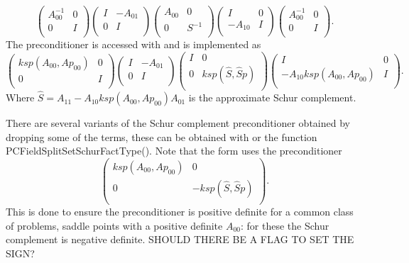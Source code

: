 \[
\left( \begin{array}{cc}
A_{00}^{-1}   & 0 \\
0 & I \\
\end{array} \right)
\left( \begin{array}{cc}
I   & -A_{01} \\
0 & I \\
\end{array} \right)
\left( \begin{array}{cc}
A_{00}  & 0 \\
0 & S^{-1} \\
\end{array} \right)
\left( \begin{array}{cc}
I   & 0 \\
-A_{10} & I \\
\end{array} \right)
\left( \begin{array}{cc}
A_{00}^{-1}   & 0 \\
0 & I \\
\end{array} \right).
\]
The preconditioner is accessed with  and is implemented as
\[
\left( \begin{array}{cc}
ksp(A_{00},Ap_{00})   & 0 \\
0 & I \\
\end{array} \right)
\left( \begin{array}{cc}
I   & -A_{01} \\
0 & I \\
\end{array} \right)
\left( \begin{array}{cc}
I  & 0 \\
0 & ksp(\hat{S},\hat{S}p) \\
\end{array} \right)
\left( \begin{array}{cc}
I   & 0 \\
-A_{10} ksp(A_{00},Ap_{00}) & I \\
\end{array} \right).
\]
Where $\hat{S} = A_{11} - A_{10} ksp(A_{00},Ap_{00}) A_{01}$ is the approximate Schur complement.

There are several variants of the Schur complement preconditioner obtained by dropping some of the terms, these can be obtained with  or the function PCFieldSplitSetSchurFactType(). Note that the  form uses the preconditioner
\[
\left( \begin{array}{cc}
ksp(A_{00},Ap_{00})   & 0 \\
0 & -ksp(\hat{S},\hat{S}p) \\
\end{array} \right).
\]
This is done to ensure the preconditioner is positive definite for a common class of problems, saddle points with a positive definite $A_{00}$:
for these the Schur complement is negative definite. SHOULD THERE BE A FLAG TO SET THE SIGN?

